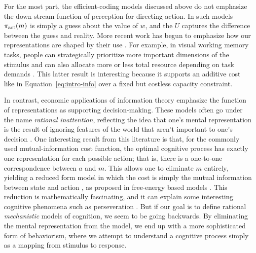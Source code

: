 For the most part, the efficient-coding models discussed above do not emphasize the down-stream function of perception for directing action. In such models $\pi_{\text{act}}(m)$ is simply a guess about the value of $w$, and the $U$ captures the difference between the guess and reality. More recent work has begun to emphasize how our representations are shaped by their use \citep{sims2018efficient}. For example, in visual working memory tasks, people can strategically prioritize more important dimensions of the stimulus \citep{yoo2018strategic} and can also allocate more or less total resource depending on task demands \citep{vandenberg2018resourcerational}. This latter result is interesting because it supports an additive cost like in Equation~\ref{eq:intro-info} over a fixed but costless capacity constraint.

In contrast, economic applications of information theory emphasize the function of representations as supporting decision-making. These models often go under the name \emph{rational inattention}, reflecting the idea that one's mental representation is the result of ignoring features of the world that aren't important to one's decision \citep{sims1998stickiness,caplin2013behavioral}. 
One interesting result from this literature is that, for the commonly used mutual-information cost function, the optimal cognitive process has exactly one representation for each possible action; that is, there is a one-to-one correspondence between $a$ and $m$. This allows one to eliminate $m$ entirely, yielding a reduced form model in which the cost is simply the mutual information between state and action \citep{matejka2015rational}, as proposed in free-energy based models \citep{friston2010freeenergy,ortega2013thermodynamics}. This reduction is mathematically fascinating, and it can explain some interesting cognitive phenomena such as perseveration \citep{gershman2020origin}. But if our goal is to define rational \emph{mechanistic} models of cognition, we seem to be going backwards. By eliminating the mental representation from the model, we end up with a more sophisticated form of behaviorism, where we attempt to understand a cognitive process simply as a mapping from stimulus to response.

